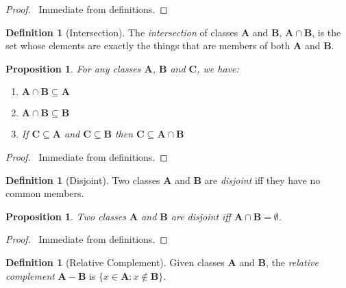 \documentclass{article}
\let\qed\relax
\newtheorem{proposition}[axiom]{Proposition}
\theoremstyle{definition}
\newtheorem{definition}[axiom]{Definition}
\begin{document}
    \begin{proof}
        \pf\ Immediate from definitions. \qed
    \end{proof}

    \begin{definition}[Intersection]
        The \emph{intersection} of classes $\mathbf{A}$ and $\mathbf{B}$, 
        $\mathbf{A} \cap \mathbf{B}$, is the set whose elements are exactly the
        things that are members of both $\mathbf{A}$ and $\mathbf{B}$.
    \end{definition}

    \begin{proposition}
        For any classes $\mathbf{A}$, $\mathbf{B}$ and $\mathbf{C}$, we have:
        \begin{enumerate}
            \item $\mathbf{A} \cap \mathbf{B} \subseteq \mathbf{A}$
            \item $\mathbf{A} \cap \mathbf{B} \subseteq \mathbf{B}$
            \item If $\mathbf{C} \subseteq \mathbf{A}$ and $\mathbf{C} \subseteq \mathbf{B}$
            then $\mathbf{C} \subseteq \mathbf{A} \cap \mathbf{B}$
        \end{enumerate}
    \end{proposition}

    \begin{proof}
        \pf\ Immediate from definitions. \qed
    \end{proof}

    \begin{definition}[Disjoint]
        Two classes $\mathbf{A}$ and $\mathbf{B}$ are \emph{disjoint} iff they have no common members.
    \end{definition}

    \begin{proposition}
        Two classes $\mathbf{A}$ and $\mathbf{B}$ are \emph{disjoint} iff $\mathbf{A} \cap \mathbf{B}
        = \emptyset$.
    \end{proposition}

    \begin{proof}
        \pf\ Immediate from definitions. \qed
    \end{proof}

    \begin{definition}[Relative Complement]
        Given classes $\mathbf{A}$ and $\mathbf{B}$, the \emph{relative complement}
        $\mathbf{A} - \mathbf{B}$ is $\{ x \in \mathbf{A} : x \notin \mathbf{B} \}$.
    \end{definition}
    
\end{document}
